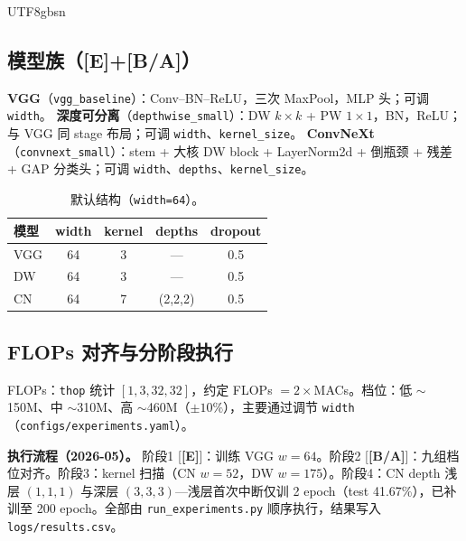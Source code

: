 \documentclass{article}
\newcommand{\grade}[1]{\textbf{\textcolor{blue!70!black}{[#1]}}}
\begin{document}
\begin{CJK}{UTF8}{gbsn}
\subsection{模型族（\grade{E}+\grade{B/A}）}

\textbf{VGG}（\texttt{vgg\_baseline}）：Conv--BN--ReLU，三次 MaxPool，MLP 头；可调 \texttt{width}。
\textbf{深度可分离}（\texttt{depthwise\_small}）：DW $k{\times}k$ + PW $1{\times}1$，BN，ReLU；与 VGG 同 stage 布局；可调 \texttt{width}、\texttt{kernel\_size}。
\textbf{ConvNeXt}（\texttt{convnext\_small}）：stem + 大核 DW block + LayerNorm2d + 倒瓶颈 + 残差 + GAP 分类头；可调 \texttt{width}、\texttt{depths}、\texttt{kernel\_size}。

\begin{table}[t]
  \caption{默认结构（\texttt{width=64}）。}
  \label{tab:struct}
  \centering
  \footnotesize
  \begin{tabular}{@{}lcccc@{}}
    \toprule
    模型 & width & kernel & depths & dropout \\
    \midrule
    VGG & 64 & 3 & --- & 0.5 \\
    DW & 64 & 3 & --- & 0.5 \\
    CN & 64 & 7 & (2,2,2) & 0.5 \\
    \bottomrule
  \end{tabular}
\end{table}

\subsection{FLOPs 对齐与分阶段执行}

FLOPs：\texttt{thop} 统计 $[1,3,32,32]$，约定 FLOPs $=2\times$MACs。档位：低 $\sim$150M、中 $\sim$310M、高 $\sim$460M（$\pm10\%$），主要通过调节 \texttt{width}（\texttt{configs/experiments.yaml}）。

\textbf{执行流程（2026-05）。} 阶段1 [\grade{E}]：训练 VGG $w{=}64$。阶段2 [\grade{B/A}]：九组档位对齐。阶段3：kernel 扫描（CN $w{=}52$，DW $w{=}175$）。阶段4：CN depth 浅层 $(1,1,1)$ 与深层 $(3,3,3)$---浅层首次中断仅训 2 epoch（test 41.67\%），已补训至 200 epoch。全部由 \texttt{run\_experiments.py} 顺序执行，结果写入 \texttt{logs/results.csv}。


\end{CJK}
\end{document}

